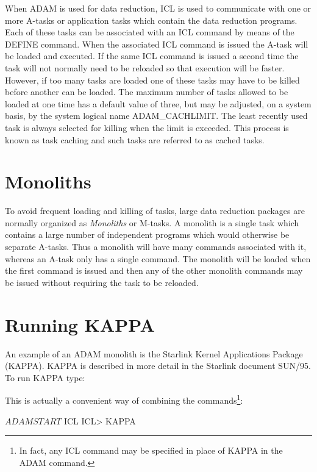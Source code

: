 \documentclass[twoside,11pt,nolof,chapters]{starlink}
\begin{document}
When ADAM is used for data reduction, ICL is used to communicate with one
or more A-tasks or application tasks which contain the data reduction programs.
Each of these tasks can be associated with an ICL command by means of the
DEFINE command. When the associated ICL command is issued the A-task will
be loaded and executed. If the same ICL command is issued a second time
the task will not normally need to be reloaded so that execution will be
faster. However, if too many tasks are loaded one of these tasks may have
to be killed before another can be loaded. The maximum number of tasks
allowed to be loaded at one time has a default value of three, but may
be adjusted, on a system basis, by the system logical name ADAM\_CACHLIMIT.
The least recently used task is always selected
for killing when the limit is exceeded. This process is known as task caching
and such tasks are referred to as cached tasks.

\section{Monoliths}

To avoid frequent loading and killing of tasks, large data reduction packages
are normally organized as \emph{Monoliths} or M-tasks. A monolith is a single
task which contains a large number of independent programs which would
otherwise be separate A-tasks. Thus a monolith will have many commands
associated with it, whereas an A-task only has a single command. The
monolith will be loaded when the first command is issued and then any
of the other monolith commands may be issued without requiring the task
to be reloaded.

\section{Running KAPPA}

An example of an ADAM monolith is the Starlink Kernel Applications Package
(KAPPA). KAPPA is described in more detail in the Starlink document SUN/95.
To run KAPPA type:


This is actually a convenient way of combining the commands\footnote{
In fact, any ICL command may be specified in place of KAPPA in the ADAM
command.}:

\begin{terminalv}
    $ ADAMSTART
    $ ICL
    ICL> KAPPA
\end{terminalv}
\end{document}
